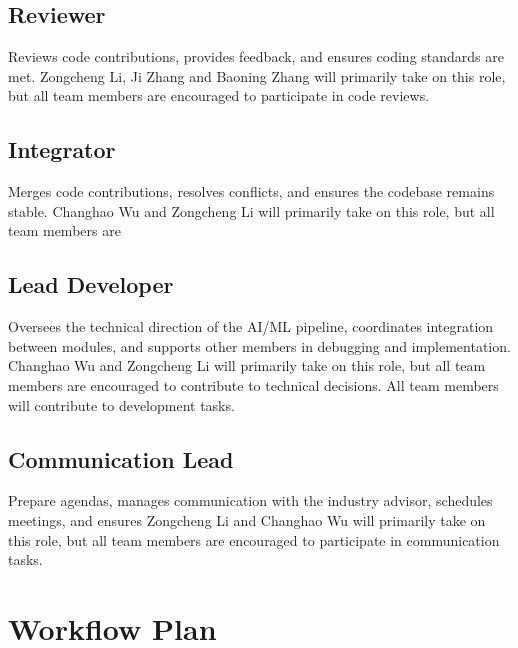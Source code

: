 \documentclass{article}
\begin{document}
\subsection*{Reviewer}
Reviews code contributions, provides feedback, and ensures coding standards are met.
Zongcheng Li, Ji Zhang and Baoning Zhang will primarily take on this role, but all team members are encouraged to participate in code reviews.

\subsection*{Integrator}
Merges code contributions, resolves conflicts, and ensures the codebase remains stable.
Changhao Wu and Zongcheng Li will primarily take on this role, but all team members are

\subsection*{Lead Developer}
Oversees the technical direction of the AI/ML pipeline, coordinates integration 
between modules, and supports other members in debugging and implementation.
Changhao Wu and Zongcheng Li will primarily take on this role, but all team members are encouraged to contribute to technical decisions.
All team members will contribute to development tasks.

\subsection*{Communication Lead}
Prepare agendas, manages communication with the industry advisor, schedules meetings, and ensures
Zongcheng Li and Changhao Wu will primarily take on this role, but all team members are encouraged to participate in communication tasks.

\section{Workflow Plan}
\end{document}
